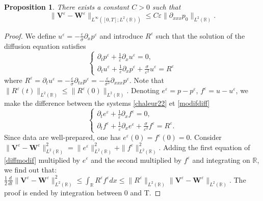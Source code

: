 \documentclass[a4paper,french,english,10pt]{article}
\newcommand\eps{\varepsilon}
\newcommand{\dt}{\partial_t}
\newcommand\V{\mathbf{V}}
\newcommand\W{\mathbf{W}}
\newtheorem{proposition}[theorem]{Proposition}
\begin{document}
\begin{proposition} \label{heqtode}
There exists a constant $C>0$ such that 
\begin{equation*}
\|\V^{\eps}-\W^\eps\|_{L^\infty([0,T];L^2(\mathbb{R}) )} \leq
C \eps  \|\partial_{xxx}p_0\|_{L^2(\mathbb{R})}.
\end{equation*}
\end{proposition}
\begin{proof}
We define $u^{\eps}=-\frac{\varepsilon}\sigma \partial_x p^{\eps}$ and
introduce $R^{\eps}$ such that the solution of the diffusion equation satisfies
\begin{equation}\label{modifdiff}
\left \{
\begin{array}{lll}
\dt p^{\eps} +\frac{1}{\eps}\partial_{x}u^{\eps}=0,\\
\partial_t u^{\eps} + \frac{1}{\eps}\partial_x p^{\eps} +\frac{\sigma}{\eps^2}u^{\eps} = R^{\eps}
\end{array}
\right.
\end{equation}
where
 $R^{\eps}=\dt u^{\eps}=-\frac{\varepsilon}\sigma \partial_{tx} p^{\eps}=
-\frac{\varepsilon}{\sigma^2} \partial_{xxx}p^{\eps}$. 
Note that 
$\|R^{\eps}(t)\|_{L^2(\mathbb{R})}\leq \|R^{\eps}(0)\|_{L^2(\mathbb{R})}$. 
Denoting $e^{\eps}=p-p^{\eps}$, $f^{\eps}=u-u^{\eps}$, we make the difference between the
systems \eqref{chaleur22} et \eqref{modifdiff}
\begin{equation}\label{diffmodif}
\left \{
\begin{array}{lll}
\dt e^{\eps} +\frac{1}{\eps}\partial_{x}f^{\eps}=0,\\
\partial_t f^{\eps} +\frac{1}{\eps}\partial_x e^{\eps} +\frac{\sigma}{\eps^2}f^{\eps} = R^{\eps}.
\end{array}
\right.
\end{equation}
Since data are well-prepared, one has $e^{\eps}(0)=f^{\eps}(0)=0$.
Consider
$\|\V^{\eps}-\W^\eps\|_{L^2(\mathbb{R})}^2=\|e^{\eps}\|_{L^2(\mathbb{R})}
^2+\|f^{\eps}\|_{L^2(\mathbb{R})}^2$.
Adding the first equation of
\eqref{diffmodif} multiplied by $e^{\eps}$ and the second multiplied by $f^{\eps}$ and integrating
on $\mathbb{R}$,
 we find out that:
$\frac12 \frac{d}{dt}\|\V^{\eps}-\W^\eps\|_{L^2(\mathbb{R})}^2 \leq
\int_{\mathbb{R}}R^{\eps}f^{\eps} dx \leq  \|R^{\eps}\|_{L^2(\mathbb{R})}
\|\V^{\eps}-\W^\eps\|_{L^2(\mathbb{R})}
.$
  The proof is ended by integration between 0 and T.

\end{proof}
\end{document}
